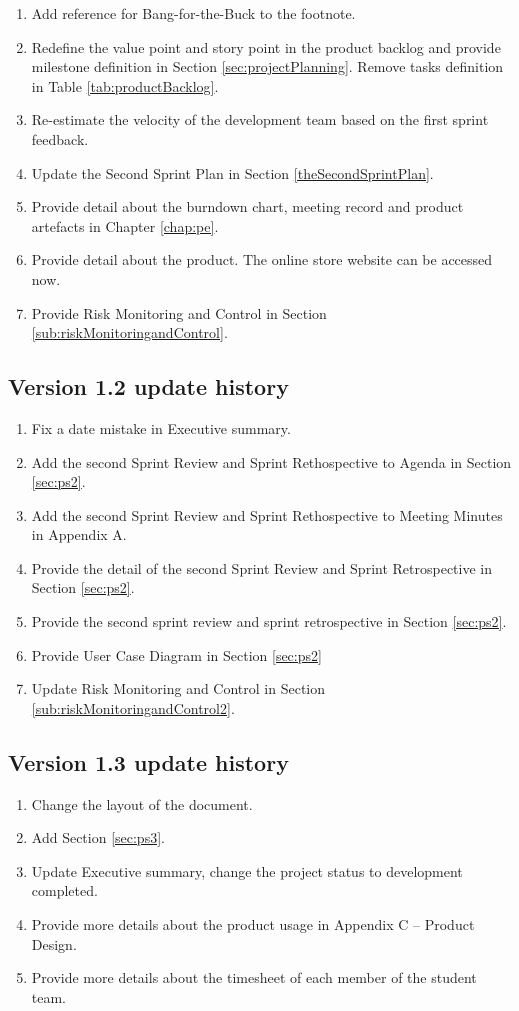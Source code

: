 \begin{enumerate}
    \item Add reference for Bang-for-the-Buck to the footnote.
    \item Redefine the value point and story point in the product backlog and provide milestone definition in Section \ref{sec:projectPlanning}. Remove tasks definition in Table \ref{tab:productBacklog}.  
    \item Re-estimate the velocity of the development team based on the first sprint feedback.
    \item Update the Second Sprint Plan in Section \ref{theSecondSprintPlan}.
    \item Provide detail about the burndown chart, meeting record and product artefacts in Chapter \ref{chap:pe}.
    \item Provide detail about the product. The online store website can be accessed now.
    \item Provide Risk Monitoring and Control in Section \ref{sub:riskMonitoringandControl}.
  \end{enumerate}

\subsection{Version 1.2 update history}
\label{sec:v1-2Up}{}
  \begin{enumerate}
    \item Fix a date mistake in Executive summary.
    \item Add the second Sprint Review and Sprint Rethospective to Agenda in Section \ref{sec:ps2}.
    \item Add the second Sprint Review and Sprint Rethospective to Meeting Minutes in Appendix A.
    \item Provide the detail of the second Sprint Review and Sprint Retrospective in Section \ref{sec:ps2}.
    \item Provide the second sprint review and sprint retrospective in Section \ref{sec:ps2}.
    \item Provide User Case Diagram in Section \ref{sec:ps2}
    \item Update Risk Monitoring and Control in Section \ref{sub:riskMonitoringandControl2}. 
  \end{enumerate}

\subsection{Version 1.3 update history}
\label{sec:v1-3Up}{}
  \begin{enumerate}
    \item Change the layout of the document.
    \item Add Section \ref{sec:ps3}.
    \item Update Executive summary, change the project status to development completed.
    \item Provide more details about the product usage in Appendix C -- Product Design.
    \item Provide more details about the timesheet of each member of the student team.
  \end{enumerate}{}